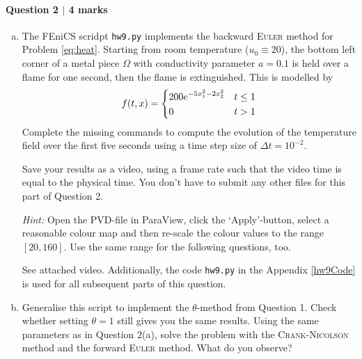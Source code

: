 \newpage
\paragraph*{Question 2 $\vert$ 4 marks}

\begin{enumerate}[(a)]
\item%
The \textsf{FEniCS} scridpt \texttt{hw9.py} implements the backward \textsc{Euler} method for Problem \eqref{eq:heat}. Starting from room temperature ($u_0 \equiv 20$), the bottom left corner of a metal piece $\Omega$ with conductivity parameter $a=0.1$ is held over a flame for one second, then the flame is extinguished. This is modelled by
\begin{equation*}
f(t,x) =
\begin{dcases}
200e^{-5x_1^2 - 2x_2^2} & t \leq 1\\
0 & t > 1
\end{dcases}
\end{equation*}
Complete the missing commands to compute the evolution of the temperature field over the first five seconds using a time step size of $\Delta t = 10^{-2}$.

Save your results as a video, using a frame rate such that the video time is equal to the physical time. You don't have to submit any other files for this part of Question 2.

\emph{Hint:} Open the PVD-file in \textsf{ParaView}, click the `Apply'-button, select a reasonable colour map
and then re-scale the colour values
to the range $[20,160]$. Use the same range for the following questions, too.

\vspace{0.5cm}
\begin{solution}

See attached video. Additionally, the code \texttt{hw9.py} in the Appendix \ref{hw9Code} is used for all subsequent parts of this question.

\end{solution}

\newpage
\item%
Generalise this script to implement the $\theta$-method from Question 1. Check whether setting $\theta = 1$ still gives you the same results. Using the same parameters as in Question 2(a), solve the problem with the \textsc{Crank-Nicolson} method and the forward \textsc{Euler} method. What do you observe?


\end{enumerate}
